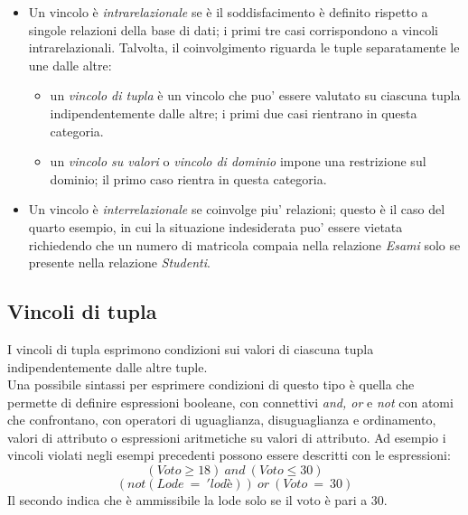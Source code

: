 \documentclass[12pt]{report}
\begin{document}
	\begin{itemize}
		\item Un vincolo è \textit{intrarelazionale} se è il soddisfacimento è definito rispetto a singole relazioni della base di dati; i primi tre casi corrispondono a vincoli intrarelazionali. Talvolta, il coinvolgimento riguarda le tuple separatamente le une dalle altre:
		\begin{itemize}
			\item un \textit{vincolo di tupla} è un vincolo che puo' essere valutato su ciascuna tupla indipendentemente dalle altre; i primi due casi rientrano in questa categoria.
			\item un \textit{vincolo su valori} o \textit{vincolo di dominio} impone una restrizione sul dominio; il primo caso rientra in questa categoria.
		\end{itemize}
		\item Un vincolo è \textit{interrelazionale} se coinvolge piu' relazioni; questo è il caso del quarto esempio, in cui la situazione indesiderata puo' essere vietata richiedendo che un numero di matricola compaia nella relazione \textit{Esami} solo se presente nella relazione \textit{Studenti}.
	\end{itemize}
	\subsection{Vincoli di tupla}
	I vincoli di tupla esprimono condizioni sui valori di ciascuna tupla indipendentemente dalle altre tuple. \\
	Una possibile sintassi per esprimere condizioni di questo tipo è quella che permette di definire espressioni booleane, con connettivi \textit{and, or} e \textit{not} con atomi che confrontano, con operatori di uguaglianza, disuguaglianza e ordinamento, valori di attributo o espressioni aritmetiche su valori di attributo. Ad esempio i vincoli violati negli esempi precedenti possono essere descritti con le espressioni:
	\[
	(Voto \geq 18)\ and\ (Voto \leq 30)
	\]
	\[
	(not(Lode\ =\ 'lodè))\ or\ (Voto\ =\ 30)
	\]
	Il secondo indica che è ammissibile la lode solo se il voto è pari a 30.
\end{document}
